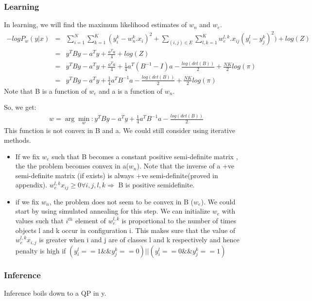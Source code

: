 \documentclass[11pt]{article} %
\begin{document}
\subsubsection{Learning}
In learning, we will find the maximum likelihood estimates of $w_n$ and $w_e$.
\begin{eqnarray*}
-log P_w (y|x) &=& \sum_{i=1}^{N} \sum_{k=1}^{K} (y_i^k - w^{k}_{n}.x_{i})^2 + \sum_{(i,j)\in E} \sum_{l,k=1}^{K} w_{e}^{l,k}.x_{ij}(y_i^l - y_j^k)^2) +log(Z)\\
&=& y^T B y-a^T y+\frac{a^Ta}{4} +log(Z)\\
&=& y^T B y-a^T y +\frac{a^Ta}{4}+\frac{1}{4}a^T (B^{-1} -I)a-\frac{log(det(B))}{2}+\frac{NK}{2}log(\pi)\\
&=& y^T B y-a^T y +\frac{1}{4}a^T B^{-1}a-\frac{log(det(B))}{2}+\frac{NK}{2}log(\pi)
\end{eqnarray*}
Note that B is a function of $w_e$ and a is a function of $w_n$.

So, we get:
\begin{eqnarray}
w=\arg\min_{w}:y^T B y-a^T y +\frac{1}{4}a^T B^{-1} a-\frac{log(det(B))}{2}
\end{eqnarray}
This function is not convex in B and a. We could still consider using iterative methods.

\begin{itemize}
\item If we fix $w_e$ such that B becomes a constant positive semi-definite matrix , the the problem becomes convex in a($w_n$). Note that the inverse of a +ve semi-definite matrix (if exists) is always +ve semi-definite(proved in appendix). $w_e^{l,k}x_{ij} \ge 0 \forall i,j,l,k \Rightarrow$ B is positive semidefinite.
\item if we fix $w_n$, the problem does not seem to be convex in B ($w_e$). We could start by using simulated annealing for this step. We can initialize $w_e$ with values such that $i^{th}$ element of $w_e^{l,k}$ is proportional to the number of times objects l and k occur in configuration i. This makes sure that the value of $w_e^{l,k}x_{i,j}$ is greater when i and j are of classes l and k respectively and hence penalty is high if  $(y_i^l==1 \&\& y_j^k==0) || (y_i^l==0 \&\& y_j^k==1)$
\end{itemize}

\subsubsection{Inference}
Inference boils down to a QP in y.
\end{document}
